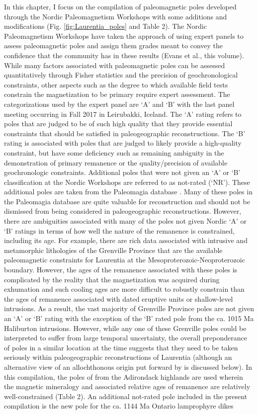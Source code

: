 \documentclass[11pt,letterpaper]{article}
\begin{document}
In this chapter, I focus on the compilation of paleomagnetic poles developed through the Nordic Paleomagnetism Workshops with some additions and modifications (Fig. \ref{fig:Laurentia_poles} and Table 2). The Nordic Paleomagnetism Workshops have taken the approach of using expert panels to assess paleomagnetic poles and assign them grades meant to convey the confidence that the community has in these results (Evans et al., this volume). While many factors associated with paleomagnetic poles can be assessed quantitatively through Fisher statistics and the precision of geochronological constraints, other aspects such as the degree to which available field tests constrain the magnetization to be primary require expert assessment. The categorizations used by the expert panel are `A' and `B' with the last panel meeting occurring in Fall 2017 in Leirubakki, Iceland. The `A' rating refers to poles that are judged to be of such high quality that they provide essential constraints that should be satisfied in paleogeographic reconstructions. The `B' rating is associated with poles that are judged to likely provide a high-quality constraint, but have some deficiency such as remaining ambiguity in the demonstration of primary remanence or the quality/precision of available geochronologic constraints. Additional poles that were not given an `A' or `B' classification at the Nordic Workshops are referred to as not-rated (`NR'). These additional poles are taken from the Paleomagia database \citep{Veikkolainen2014a}. Many of these poles in the Paleomagia database are quite valuable for reconstruction and should not be dismissed from being considered in paleogeographic reconstructions. However, there are ambiguities associated with many of the poles not given Nordic `A' or `B' ratings in terms of how well the nature of the remanence is constrained, including its age. For example, there are rich data associated with intrusive and metamorphic lithologies of the Grenville Province that are the available paleomagnetic constraints for Laurentia at the Mesoproterozoic-Neoproterozoic boundary. However, the ages of the remanence associated with these poles is complicated by the reality that the magnetization was acquired during exhumation and such cooling ages are more difficult to robustly constrain than the ages of remanence associated with dated eruptive units or shallow-level intrusions. As a result, the vast majority of Grenville Province poles are not given an `A' or `B' rating with the exception of the `B' rated pole from the ca. 1015 Ma Haliburton intrusions. However, while any one of these Grenville poles could be interpreted to suffer from large temporal uncertainty, the overall preponderance of poles in a similar location at the time suggests that they need to be taken seriously within paleogeographic reconstructions of Laurentia (although an alternative view of an allochthonous origin put forward by \citet{Halls2015a} is discussed below). In this compilation, the poles of \cite{Brown2012a} from the Adirondack highlands are used wherein the magnetic mineralogy and associated relative ages of remanence are relatively well-constrained (Table 2). An additional not-rated pole included in the present compilation is the new pole for the ca. 1144 Ma Ontario lamprophyre dikes \citep{Piispa2018a} 
\end{document}
